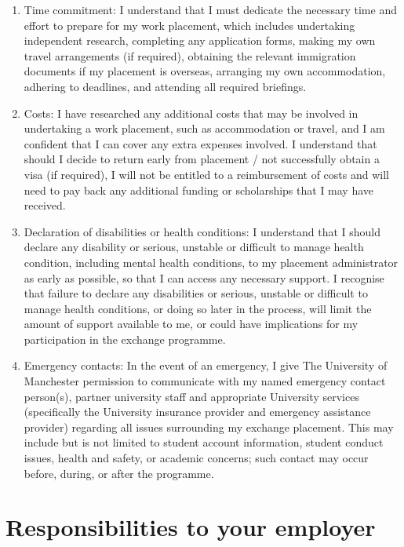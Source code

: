 \documentclass[
]{book}
\providecommand{\tightlist}{%
  \setlength{\itemsep}{0pt}\setlength{\parskip}{0pt}}
\begin{document}
\begin{enumerate}
\def\labelenumi{\arabic{enumi}.}
\tightlist
\item
  Time commitment: I understand that I must dedicate the necessary time and effort to prepare for my work placement, which includes undertaking independent research, completing any application forms, making my own travel arrangements (if required), obtaining the relevant immigration documents if my
  placement is overseas, arranging my own accommodation, adhering to deadlines, and attending all required briefings.
\item
  Costs: I have researched any additional costs that may be involved in undertaking a work placement, such as accommodation or travel, and I am confident that I can cover any extra expenses involved. I understand that should I decide to return early from placement / not successfully obtain a visa (if required), I will not be entitled to a reimbursement of costs and will need to pay back any additional funding or scholarships that I may have received.
\item
  Declaration of disabilities or health conditions: I understand that I should declare any disability or serious, unstable or difficult to manage health condition, including mental health conditions, to my placement administrator as early as possible, so that I can access any necessary support. I recognise that failure to declare any disabilities or serious, unstable or difficult to manage health conditions, or doing so later in the process, will limit the amount of support available to me, or could have implications for my participation in the exchange programme.
\item
  Emergency contacts: In the event of an emergency, I give The University of Manchester permission to communicate with my named emergency contact person(s), partner university staff and appropriate University services (specifically the University insurance provider and emergency assistance provider) regarding all issues surrounding my exchange placement. This may include but is not limited to student account information, student conduct issues, health and safety, or academic concerns; such contact
  may occur before, during, or after the programme.
\end{enumerate}

\section{Responsibilities to your employer}\label{responsibilities-to-your-employer}
\end{document}
